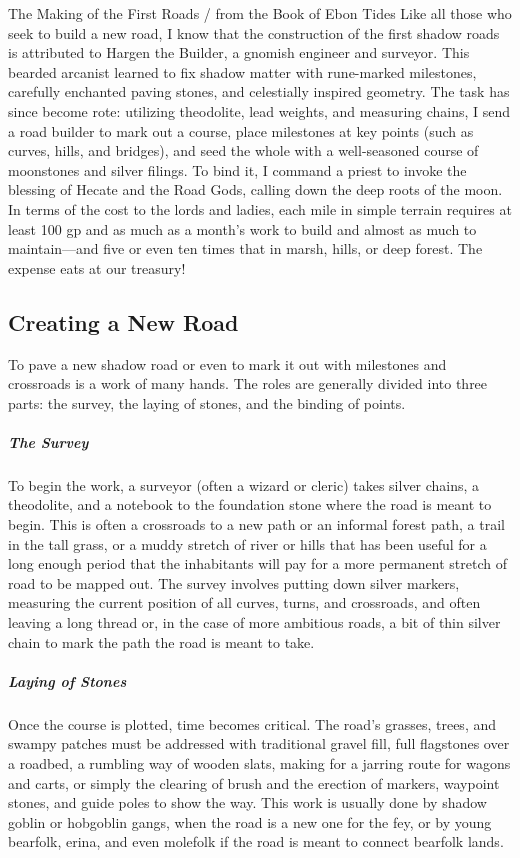 \documentclass[10pt,a4paper,twoside,bg=print,twocolumn,openany,nodeprecatedcode]{dndbook}
\begin{document}
\begin{DndSidebar}[float=!b]{The Making of the First Roads / from the Book of Ebon Tides}
Like all those who seek to build a new road, I know that the construction of the first shadow roads is attributed to Hargen the Builder, a gnomish engineer and surveyor. This bearded arcanist learned to fix shadow matter with rune-marked milestones, carefully enchanted paving stones, and celestially inspired geometry. The task has since become rote: utilizing theodolite, lead weights, and measuring chains, I send a road builder to mark out a course, place milestones at key points (such as curves, hills, and bridges), and seed the whole with a well-seasoned course of moonstones and silver filings. To bind it, I command a priest to invoke the blessing of Hecate and the Road Gods, calling down the deep roots of the moon. In terms of the cost to the lords and ladies, each mile in simple terrain requires at least 100 gp and as much as a month's work to build and almost as much to maintain—and five or even ten times that in marsh, hills, or deep forest. The expense eats at our treasury!



\end{DndSidebar}

\subsection{Creating a New Road}
To pave a new shadow road or even to mark it out with milestones and crossroads is a work of many hands. The roles are generally divided into three parts: the survey, the laying of stones, and the binding of points.

\subparagraph{The Survey}
To begin the work, a surveyor (often a wizard or cleric) takes silver chains, a theodolite, and a notebook to the foundation stone where the road is meant to begin. This is often a crossroads to a new path or an informal forest path, a trail in the tall grass, or a muddy stretch of river or hills that has been useful for a long enough period that the inhabitants will pay for a more permanent stretch of road to be mapped out. The survey involves putting down silver markers, measuring the current position of all curves, turns, and crossroads, and often leaving a long thread or, in the case of more ambitious roads, a bit of thin silver chain to mark the path the road is meant to take.

\subparagraph{Laying of Stones}
Once the course is plotted, time becomes critical. The road's grasses, trees, and swampy patches must be addressed with traditional gravel fill, full flagstones over a roadbed, a rumbling way of wooden slats, making for a jarring route for wagons and carts, or simply the clearing of brush and the erection of markers, waypoint stones, and guide poles to show the way. This work is usually done by shadow goblin or hobgoblin gangs, when the road is a new one for the fey, or by young bearfolk, erina, and even molefolk if the road is meant to connect bearfolk lands.
\end{document}
